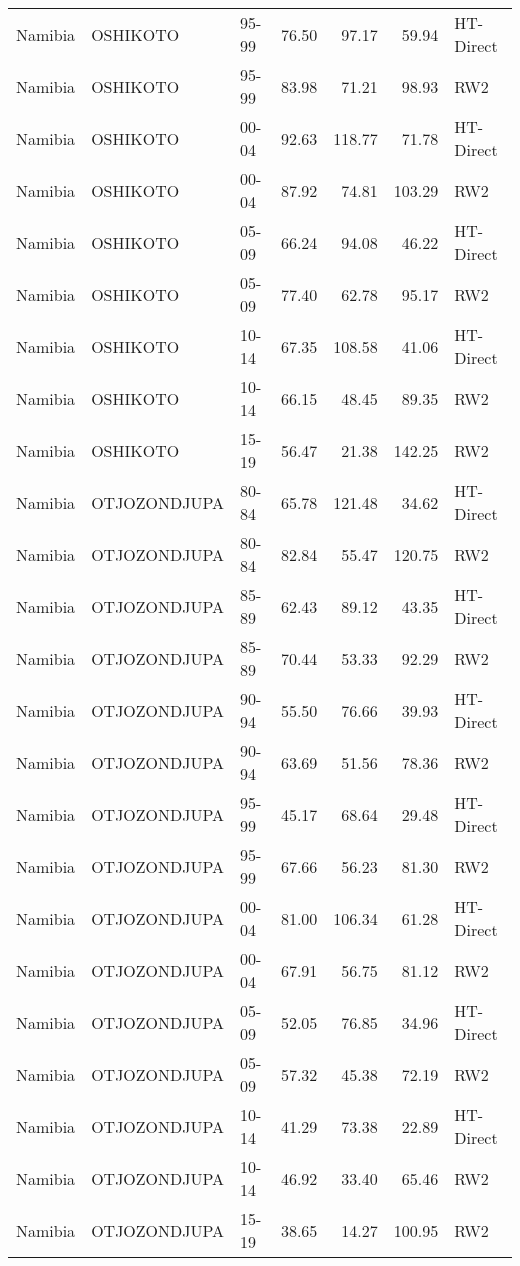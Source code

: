 \begin{longtable}{lllrrrl}
  Namibia & OSHIKOTO & 95-99 & 76.50 & 97.17 & 59.94 & HT-Direct \\ 
  Namibia & OSHIKOTO & 95-99 & 83.98 & 71.21 & 98.93 & RW2 \\ 
  Namibia & OSHIKOTO & 00-04 & 92.63 & 118.77 & 71.78 & HT-Direct \\ 
  Namibia & OSHIKOTO & 00-04 & 87.92 & 74.81 & 103.29 & RW2 \\ 
  Namibia & OSHIKOTO & 05-09 & 66.24 & 94.08 & 46.22 & HT-Direct \\ 
  Namibia & OSHIKOTO & 05-09 & 77.40 & 62.78 & 95.17 & RW2 \\ 
  Namibia & OSHIKOTO & 10-14 & 67.35 & 108.58 & 41.06 & HT-Direct \\ 
  Namibia & OSHIKOTO & 10-14 & 66.15 & 48.45 & 89.35 & RW2 \\ 
  Namibia & OSHIKOTO & 15-19 & 56.47 & 21.38 & 142.25 & RW2 \\ 
  Namibia & OTJOZONDJUPA & 80-84 & 65.78 & 121.48 & 34.62 & HT-Direct \\ 
  Namibia & OTJOZONDJUPA & 80-84 & 82.84 & 55.47 & 120.75 & RW2 \\ 
  Namibia & OTJOZONDJUPA & 85-89 & 62.43 & 89.12 & 43.35 & HT-Direct \\ 
  Namibia & OTJOZONDJUPA & 85-89 & 70.44 & 53.33 & 92.29 & RW2 \\ 
  Namibia & OTJOZONDJUPA & 90-94 & 55.50 & 76.66 & 39.93 & HT-Direct \\ 
  Namibia & OTJOZONDJUPA & 90-94 & 63.69 & 51.56 & 78.36 & RW2 \\ 
  Namibia & OTJOZONDJUPA & 95-99 & 45.17 & 68.64 & 29.48 & HT-Direct \\ 
  Namibia & OTJOZONDJUPA & 95-99 & 67.66 & 56.23 & 81.30 & RW2 \\ 
  Namibia & OTJOZONDJUPA & 00-04 & 81.00 & 106.34 & 61.28 & HT-Direct \\ 
  Namibia & OTJOZONDJUPA & 00-04 & 67.91 & 56.75 & 81.12 & RW2 \\ 
  Namibia & OTJOZONDJUPA & 05-09 & 52.05 & 76.85 & 34.96 & HT-Direct \\ 
  Namibia & OTJOZONDJUPA & 05-09 & 57.32 & 45.38 & 72.19 & RW2 \\ 
  Namibia & OTJOZONDJUPA & 10-14 & 41.29 & 73.38 & 22.89 & HT-Direct \\ 
  Namibia & OTJOZONDJUPA & 10-14 & 46.92 & 33.40 & 65.46 & RW2 \\ 
  Namibia & OTJOZONDJUPA & 15-19 & 38.65 & 14.27 & 100.95 & RW2 \\ 

\end{longtable}
